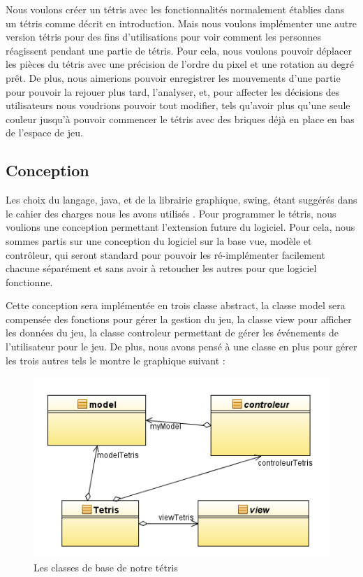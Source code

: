 \documentclass{article}           %
\begin{document}
Nous voulons créer un tétris avec les fonctionnalités normalement établies dans un tétris comme décrit en introduction. Mais nous voulons implémenter une autre version tétris pour des fins d'utilisations pour voir comment les personnes réagissent pendant une partie de tétris. Pour cela, nous voulons pouvoir déplacer les pièces du tétris avec une précision de l'ordre du pixel et une rotation au degré prêt. De plus, nous aimerions pouvoir enregistrer les mouvements d'une partie pour pouvoir la rejouer plus tard, l'analyser, et, pour affecter les décisions des utilisateurs nous voudrions pouvoir tout modifier, tels qu'avoir plus qu'une seule couleur jusqu’à pouvoir commencer le tétris avec des briques déjà en place en bas de l'espace de jeu.


\subsection{Conception}
Les choix du langage, java, et de la librairie graphique, swing, étant suggérés dans le cahier des charges nous les  avons utilisés . Pour programmer le tétris, nous voulions une conception permettant l’extension future du logiciel. Pour cela, nous sommes partis sur une conception du logiciel sur la base vue, modèle et contrôleur, qui seront standard pour pouvoir les ré-implémenter facilement chacune séparément et sans avoir à retoucher les autres pour que logiciel fonctionne.

Cette conception sera implémentée en trois classe abstract, la classe model sera compensée des fonctions pour gérer la gestion du jeu, la classe view pour afficher les données du jeu, la classe controleur permettant de gérer les événements de l'utilisateur pour le jeu. De plus, nous avons pensé à une classe en plus pour gérer les trois autres tels le montre le graphique suivant :


\begin{figure}[h]
   \caption{Les classes de base de notre tétris}
   \includegraphics{diagram1.png}
\end{figure}
\end{document}
